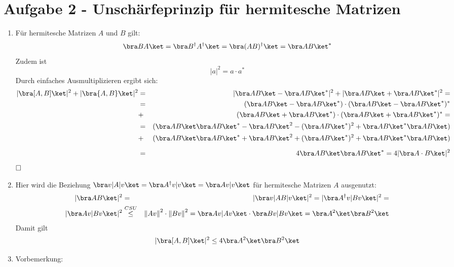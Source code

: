 \section*{Aufgabe 2 - Unschärfeprinzip für hermitesche Matrizen}
\begin{enumerate}
        \item Für hermitesche Matrizen $A$ und $B$ gilt: 
        \[ \bra BA \ket = \bra B^{\dag}A^{\dag} \ket = \bra (AB)^{\dag} \ket = \bra AB \ket^* \]
        Zudem ist \[ | a |^2 = a \cdot a^* \]
        Durch einfaches Ausmultiplizieren ergibt sich:
        \begin{eqnarray*}
        |\bra [A,B] \ket|^2 + |\bra \{A,B\} \ket|^2 &=& |\bra AB \ket - \bra AB \ket^*|^2 
             + |\bra AB \ket + \bra AB \ket^*|^2 = \\
        &=& (\bra AB \ket - \bra AB \ket^*)\cdot(\bra AB \ket - \bra AB \ket^*)^* \\
        &+& (\bra AB \ket + \bra AB \ket^*)\cdot(\bra AB \ket + \bra AB \ket^*)^* = \\
        &=& (\bra AB \ket \bra AB \ket^* - \bra AB \ket^2 - (\bra AB \ket^*)^2
        + \bra AB \ket^* \bra AB \ket) \\ &+& (\bra AB \ket \bra AB \ket^* + \bra AB \ket^2
        + (\bra AB \ket^*)^2 + \bra AB \ket^* \bra AB \ket) \\[0.5em]
        &=& 4 \bra AB \ket \bra AB \ket^* = 4 |\bra A\cdot B \ket|^2 
        \end{eqnarray*}
        $\hfill\square$
        \item Hier wird die Beziehung $\bra v | A | v \ket = \bra A^{\dag}v | v
        \ket = \bra Av | v \ket$ für hermitesche Matrizen $A$ ausgenutzt:
        \begin{eqnarray*}
        |\bra AB \ket|^2 &=& |\bra v | AB | v \ket |^2 = |\bra A^{\dag}v | Bv \ket|^2 = \\
        |\bra Av | Bv \ket|^2 &\overset{CSU}{\leq}&
        \left\|Av\right\|^2\cdot\left\|Bv\right\|^2 = \bra Av | Av \ket \cdot \bra Bv |
        Bv \ket = \bra A^2 \ket \bra B^2 \ket
        \end{eqnarray*}
        Damit gilt
        \begin{equation}
                |\bra[A,B]\ket|^2 \leq 4\bra A^2 \ket \bra B^2 \ket
        \end{equation}
        \item
        Vorbemerkung: 
        \begin{eqnarray*}

\end{eqnarray*}
\end{enumerate}
